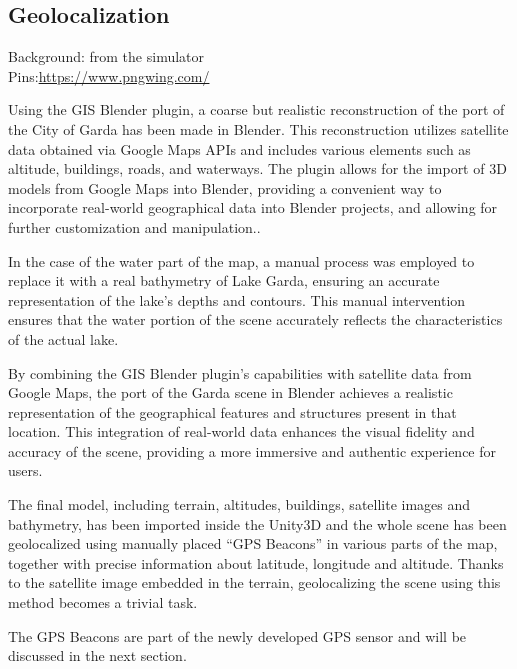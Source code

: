 
\subsection{Geolocalization}
{Background: from the simulator\\Pins:\url{https://www.pngwing.com/}}

\begin{textblock}
Using the GIS Blender plugin, a coarse but realistic reconstruction of the port of the City of Garda has been made in Blender. This reconstruction utilizes satellite data obtained via Google Maps APIs and includes various elements such as altitude, buildings, roads, and waterways. The plugin allows for the import of 3D models from Google Maps into Blender, providing a convenient way to incorporate real-world geographical data into Blender projects, and allowing for further customization and manipulation.\cite{blendergis}.

In the case of the water part of the map, a manual process was employed to replace it with a real bathymetry of Lake Garda, ensuring an accurate representation of the lake's depths and contours. This manual intervention ensures that the water portion of the scene accurately reflects the characteristics of the actual lake.

By combining the GIS Blender plugin's capabilities with satellite data from Google Maps, the port of the Garda scene in Blender achieves a realistic representation of the geographical features and structures present in that location. This integration of real-world data enhances the visual fidelity and accuracy of the scene, providing a more immersive and authentic experience for users.

The final model, including terrain, altitudes, buildings, satellite images and bathymetry, has been imported inside the Unity3D and the whole scene has been geolocalized using manually placed “GPS Beacons” in various parts of the map, together with precise information about latitude, longitude and altitude. Thanks to the satellite image embedded in the terrain, geolocalizing the scene using this method becomes a trivial task.

The GPS Beacons are part of the newly developed GPS sensor and will be discussed in the next section.
\end{textblock}



